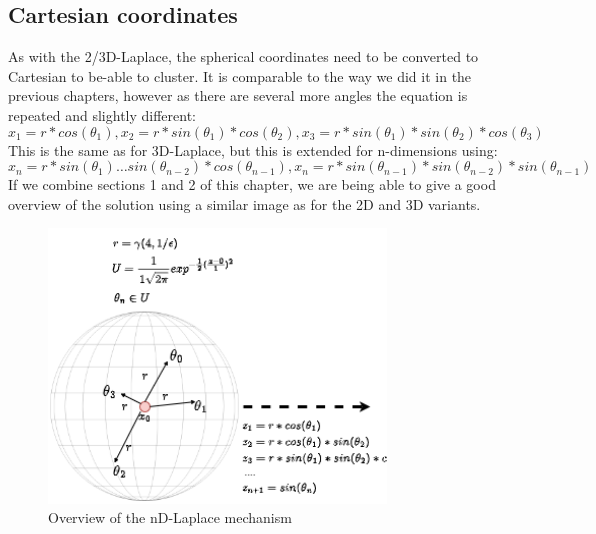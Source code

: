\subsection{Cartesian coordinates}
As with the 2/3D-Laplace, the spherical coordinates need to be converted to Cartesian to be-able to cluster.
It is comparable to the way we did it in the previous chapters, however as there are several more angles the equation is repeated and slightly different:
\begin{equation}
  x_1 = r * cos (\theta_1),
  x_2 = r * sin (\theta_1) * cos (\theta_2),
  x_3 = r * sin(\theta_1) * sin(\theta_2) * cos(\theta_3)
\end{equation}
This is the same as for 3D-Laplace, but this is extended for n-dimensions using:
\begin{equation}
  x_{n} = r * sin(\theta_1) … sin(\theta_{n-2}) *cos (\theta_{n-1}), x_n= r * sin(\theta_{n-1}) * sin(\theta_{n-2}) * sin(\theta_{n-1})
\end{equation}
If we combine sections 1 and 2 of this chapter, we are being able to give a good overview of the solution using a similar image as for the 2D and 3D variants.
\begin{figure}
  \label{fig:nd-laplace-overview}
  \includegraphics[width=0.8\textwidth]{TheorethicalFramework/ND-Laplace/Images/nd_laplace.png}
  \caption{Overview of the nD-Laplace mechanism}
\end{figure}

